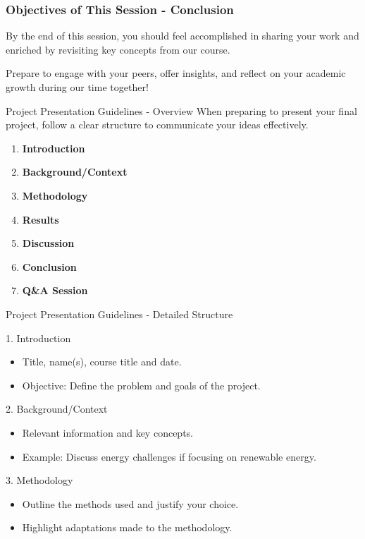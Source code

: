 \documentclass[aspectratio=169]{beamer}
\begin{document}
\begin{frame}[fragile]
    \frametitle{Objectives of This Session - Conclusion}
    By the end of this session, you should feel accomplished in sharing your work and enriched by revisiting key concepts from our course.

    Prepare to engage with your peers, offer insights, and reflect on your academic growth during our time together!
\end{frame}

\begin{frame}[fragile]{Project Presentation Guidelines - Overview}
    When preparing to present your final project, follow a clear structure to communicate your ideas effectively.
    
    \begin{enumerate}
        \item \textbf{Introduction}
        \item \textbf{Background/Context}
        \item \textbf{Methodology}
        \item \textbf{Results}
        \item \textbf{Discussion}
        \item \textbf{Conclusion}
        \item \textbf{Q\&A Session}
    \end{enumerate}
\end{frame}

\begin{frame}[fragile]{Project Presentation Guidelines - Detailed Structure}
    \begin{block}{1. Introduction}
        \begin{itemize}
            \item Title, name(s), course title and date.
            \item Objective: Define the problem and goals of the project.
        \end{itemize}
    \end{block}

    \begin{block}{2. Background/Context}
        \begin{itemize}
            \item Relevant information and key concepts.
            \item Example: Discuss energy challenges if focusing on renewable energy.
        \end{itemize}
    \end{block}

    \begin{block}{3. Methodology}
        \begin{itemize}
            \item Outline the methods used and justify your choice.
            \item Highlight adaptations made to the methodology.
        \end{itemize}
    \end{block}
\end{frame}
\end{document}
